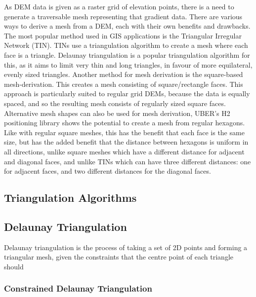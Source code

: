 \documentclass[
]{article}
\begin{document}
As DEM data is given as a raster grid of elevation points, there is a
need to generate a traversable mesh representing that gradient data.
There are various ways to derive a mesh from a DEM, each with their own
benefits and drawbacks. The most popular method used in GIS applications
is the Triangular Irregular Network (TIN). TINs use a triangulation
algorithm to create a mesh where each face is a triangle. Delaunay
triangulation is a popular triangulation algorithm for this, as it aims
to limit very thin and long triangles, in favour of more equilateral,
evenly sized triangles. Another method for mesh derivation is the
square-based mesh-derivation. This creates a mesh consisting of
square/rectangle faces. This approach is particularly suited to regular
grid DEMs, because the data is equally spaced, and so the resulting mesh
consists of regularly sized square faces. Alternative mesh shapes can
also be used for mesh derivation, UBER's H2 positioning library shows
the potential to create a mesh from regular hexagons. Like with regular
square meshes, this has the benefit that each face is the same size, but
has the added benefit that the distance between hexagons is uniform in
all directions, unlike square meshes which have a different distance for
adjacent and diagonal faces, and unlike TINs which can have three
different distances: one for adjacent faces, and two different distances
for the diagonal faces.

\hypertarget{triangulation-algorithms}{%
\subsection{Triangulation Algorithms}\label{triangulation-algorithms}}

\hypertarget{delaunay-triangulation}{%
\subsection{Delaunay Triangulation}\label{delaunay-triangulation}}

Delaunay triangulation is the process of taking a set of 2D points and
forming a triangular mesh, given the constraints that the centre point
of each triangle should

\hypertarget{constrained-delaunay-triangulation}{%
\subsubsection{Constrained Delaunay
Triangulation}\label{constrained-delaunay-triangulation}}
\end{document}
